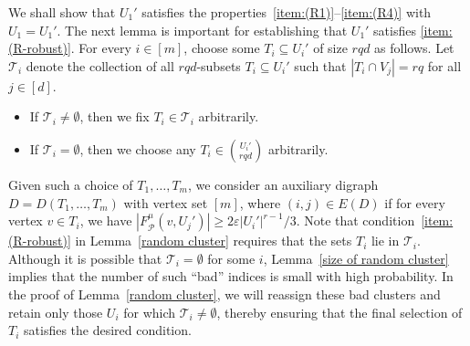 \documentclass[11pt, letterpaper]{amsart}
\theoremstyle{plain}
\numberwithin{equation}{section}
\theoremstyle{definition}
\newcommand\card[1]{\left| #1 \right|}
\begin{document}
We shall show that $U_1'$ satisfies the properties~\ref{item:(R1)}--\ref{item:(R4)} with $U_1=U_1'$. The next lemma is important for establishing that $U_1'$ satisfies \ref{item:(R-robust)}. 
        For every \(i\in [m]\), choose some \(T_i \subseteq U_i'\) of size \(rqd\) as follows. Let \(\mathcal{T}_i\) denote the collection of all \(rqd\)-subsets \(T_i\subseteq U_i'\) such that \(\card{T_i\cap V_j}=rq\) for all \(j\in [d]\). 
        \begin{itemize}
            \item If \(\mathcal{T}_i\neq\emptyset\), then we fix \(T_i\in\mathcal{T}_i\) arbitrarily.
            \item If \(\mathcal{T}_i=\emptyset\), then we choose any \(T_i\in\binom{U_i'}{rqd}\) arbitrarily.
        \end{itemize} 
        Given such a choice of \(T_1,\dots,T_m\), we consider an auxiliary digraph \(D=D(T_1,\dots,T_m)\) with vertex set \([m]\), where \((i,j)\in E(D)\) if for every vertex \(v\in T_i\), we have \(\card{F^{\mu}_{\mathcal{P}}(v, U_j')}\ge 2\varepsilon{\card{U_i'}}^{r-1}/3.\) 
        Note that condition~\ref{item:(R-robust)} in Lemma~\ref{random cluster} requires that the sets \(T_i\) lie in \(\mathcal{T}_i\). Although it is possible that \(\mathcal{T}_i=\emptyset\) for some \(i\), Lemma~\ref{size of random cluster} implies that the number of such ``bad'' indices is small with high probability. In the proof of Lemma~\ref{random cluster}, we will reassign these bad clusters and retain only those \(U_i\) for which \(\mathcal{T}_i\neq\emptyset\), thereby ensuring that the final selection of \(T_i\) satisfies the desired condition. 
 
\end{document}
